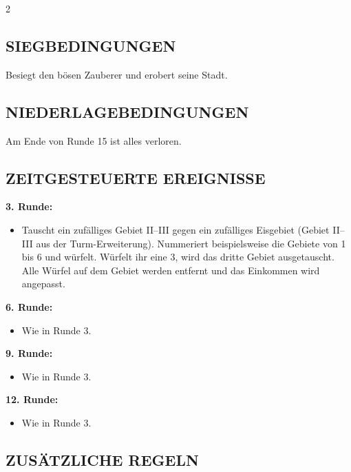 \begin{multicols*}{2}
\subsection*{\MakeUppercase{Siegbedingungen}}
Besiegt den bösen Zauberer und erobert seine Stadt.

\subsection*{\MakeUppercase{Niederlagebedingungen}}
Am Ende von Runde 15 ist alles verloren.

\subsection*{\MakeUppercase{Zeitgesteuerte Ereignisse}}

\textbf{3. Runde:}
\begin{itemize}
  \item Tauscht ein zufälliges Gebiet II--III gegen ein zufälliges Eisgebiet (Gebiet II--III aus der Turm-Erweiterung). Nummeriert beispielsweise die Gebiete von 1 bis 6 und würfelt. Würfelt ihr eine 3, wird das dritte Gebiet ausgetauscht. Alle Würfel auf dem Gebiet werden entfernt und das Einkommen wird angepasst.
\end{itemize}

\textbf{6. Runde:}
\begin{itemize}
  \item Wie in Runde 3.
\end{itemize}

\textbf{9. Runde:}
\begin{itemize}
  \item Wie in Runde 3.
\end{itemize}

\textbf{12. Runde:}
\begin{itemize}
  \item Wie in Runde 3.
\end{itemize}

\subsection*{\MakeUppercase{Zusätzliche Regeln}}


\end{multicols*}
